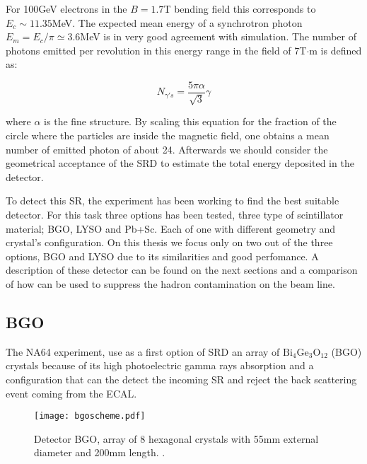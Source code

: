 For 100GeV electrons in the $B=1.7$T bending field this corresponds to $E_c \sim 11.35$MeV. The expected mean energy of
a synchrotron photon $E_m=E_c/\pi \simeq 3.6$MeV is in very good agreement with simulation. The number of photons
emitted per revolution in this energy range in the field of 7T$\cdot$m is defined as:

\begin{equation}
N_{\gamma's} = \frac{5\pi\alpha}{\sqrt{3}}\gamma
\end{equation}

where $\alpha$ is the fine structure. By scaling this equation for the fraction of the circle where the particles are
inside the magnetic field, one obtains a mean number of emitted photon of about 24. Afterwards we should consider the
geometrical acceptance of the SRD to estimate the total energy deposited in the detector.\par

To detect this SR, the experiment has been working to find the best suitable detector. For this task three options has
been tested, three type of scintillator material; BGO, LYSO and Pb+Sc. Each of one with different geometry and
crystal's configuration. On this thesis we focus only on two out of the three options, BGO and LYSO due to its
similarities and good perfomance. A description of
these detector can be found on the next sections and a comparison of how can be used to suppress the hadron contamination on the beam
line.\par


\subsection{BGO}\label{bgoanal}

The NA64 experiment, use as a first option of SRD an array of $\mathrm{Bi_4Ge_3O_{12}}$ (BGO) crystals because of its
high photoelectric gamma rays absorption and a configuration that can the detect the incoming SR and reject the back
scattering event coming from the ECAL.\par

\begin{figure}[ht]
	\centering
	\hspace*{\fill}
	\texttt{[image: bgoscheme.pdf]}
	\hspace*{\fill}
	\captionsetup{margin=1cm}
	\caption{Detector BGO, array of 8 hexagonal crystals with 55mm external diameter and 200mm length. .}\label{bgoscheme}
\end{figure}


